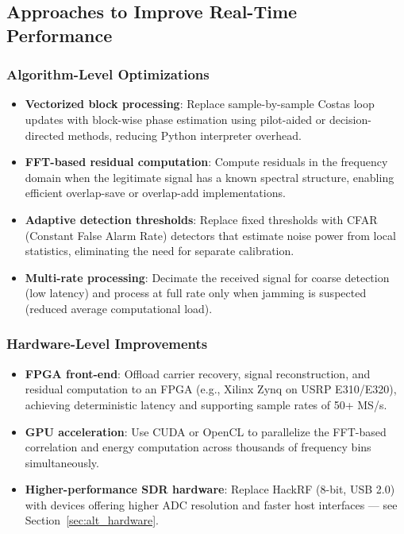 \documentclass{article}
\begin{document}
\subsection{Approaches to Improve Real-Time Performance}

\subsubsection{Algorithm-Level Optimizations}

\begin{itemize}
\item \textbf{Vectorized block processing}: Replace sample-by-sample Costas loop updates with block-wise phase estimation using pilot-aided or decision-directed methods, reducing Python interpreter overhead.
\item \textbf{FFT-based residual computation}: Compute residuals in the frequency domain when the legitimate signal has a known spectral structure, enabling efficient overlap-save or overlap-add implementations.
\item \textbf{Adaptive detection thresholds}: Replace fixed thresholds with CFAR (Constant False Alarm Rate) detectors that estimate noise power from local statistics, eliminating the need for separate calibration.
\item \textbf{Multi-rate processing}: Decimate the received signal for coarse detection (low latency) and process at full rate only when jamming is suspected (reduced average computational load).
\end{itemize}

\subsubsection{Hardware-Level Improvements}

\begin{itemize}
\item \textbf{FPGA front-end}: Offload carrier recovery, signal reconstruction, and residual computation to an FPGA (e.g., Xilinx Zynq on USRP E310/E320), achieving deterministic latency and supporting sample rates of 50+ MS/s.
\item \textbf{GPU acceleration}: Use CUDA or OpenCL to parallelize the FFT-based correlation and energy computation across thousands of frequency bins simultaneously.
\item \textbf{Higher-performance SDR hardware}: Replace HackRF (8-bit, USB 2.0) with devices offering higher ADC resolution and faster host interfaces — see Section~\ref{sec:alt_hardware}.
\end{itemize}
\end{document}
